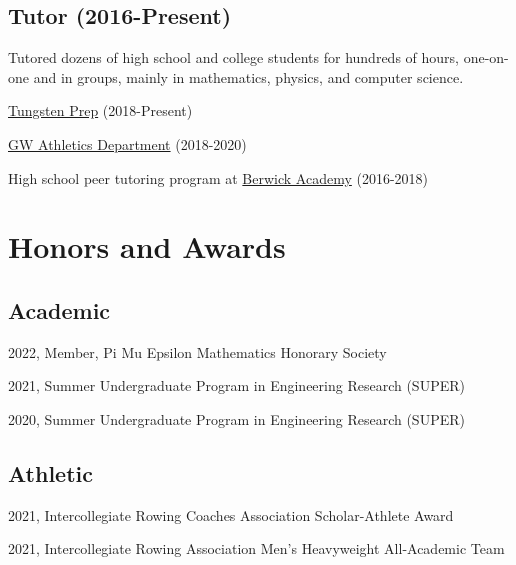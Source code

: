 \documentclass[letterpaper]{article}
\renewenvironment{itemize}{
  \begin{list}{}{
    \setlength{\leftmargin}{1.5em}
  }
}{
  \end{list}
}
\begin{document}
\subsection*{Tutor (2016-Present)}
Tutored dozens of high school and college students for hundreds of hours, one-on-one and in groups, mainly in mathematics, physics, and computer science. 
\begin{itemize}
\item
\href{https://www.tungstenprep.com/}{Tungsten Prep} (2018-Present) 
\item
\href{https://gwsports.com/sports/2018/7/23/school-bio-academic-support-tutor-info-html.aspx}{GW Athletics Department} (2018-2020) 
\item 
High school peer tutoring program at \href{https://www.berwickacademy.org/}{Berwick Academy} (2016-2018)
\end{itemize}


\section*{Honors and Awards}

\subsection*{Academic}
\begin{itemize}
\item 2022, Member, Pi Mu Epsilon Mathematics Honorary Society
\item 2021, Summer Undergraduate Program in Engineering Research (SUPER)
\item 2020, Summer Undergraduate Program in Engineering Research (SUPER)
\end{itemize}
\subsection*{Athletic}
\begin{itemize}
\item 2021, Intercollegiate Rowing Coaches Association Scholar-Athlete Award
\item 2021, Intercollegiate Rowing Association Men's Heavyweight All-Academic Team
\end{itemize}
\end{document}
